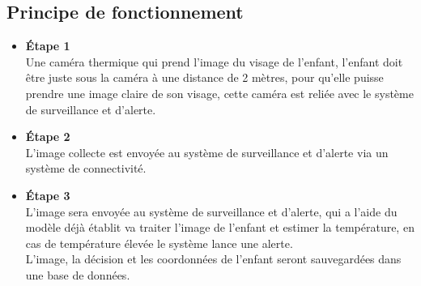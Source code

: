 \documentclass[12pt]{article}
\begin{document}
\subsection{Principe de fonctionnement}
\begin{itemize}
	\item \textbf{Étape 1}\\
	Une caméra thermique qui prend l'image du visage de l'enfant, l'enfant doit être juste sous la caméra à une distance de 2 mètres, pour qu’elle puisse prendre une image claire de son visage, cette caméra est reliée avec le système de surveillance et d'alerte.
	\item \textbf{Étape 2}\\
	L'image collecte est envoyée au système de surveillance et d'alerte via un système de connectivité.
	\item \textbf{Étape 3}\\
	L'image sera envoyée  au système de surveillance et d'alerte, qui a l'aide du modèle déjà établit va traiter l'image de l’enfant et estimer la température, en cas de température élevée le système lance une alerte.\\
	L'image, la décision et les coordonnées de l'enfant seront sauvegardées dans une base de données.
\end{itemize}
\end{document}
